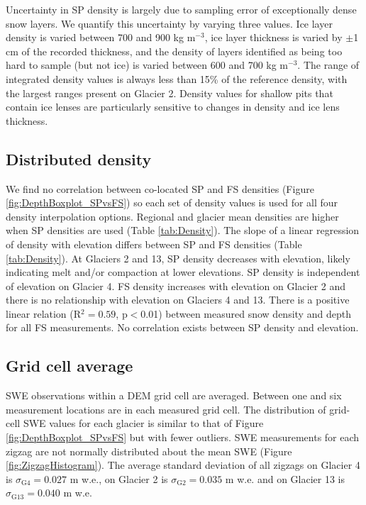 \documentclass[review,oneside, letterpaper]{igs}
\begin{document}
Uncertainty in SP density is largely due to sampling error of exceptionally dense snow layers. We quantify this uncertainty by varying three values. Ice layer density is varied between 700 and 900 kg m$^{-3}$, ice layer thickness is varied by $\pm$1 cm of the recorded thickness, and the density of layers identified as being too hard to sample (but not ice) is varied between 600 and 700 kg m$^{-3}$. The range of integrated density values is always less than 15\% of the reference density, with the largest ranges present on Glacier 2. Density values for shallow pits that contain ice lenses are particularly sensitive to changes in density and ice lens thickness.

\subsection{Distributed density}

We find no correlation between co-located SP and FS densities (Figure \ref{fig:DepthBoxplot_SPvsFS}) so each set of density values is used for all four density interpolation options. Regional and glacier mean densities are higher when SP densities are used (Table \ref{tab:Density}). The slope of a linear regression of density with elevation differs between SP and FS densities (Table \ref{tab:Density}). At Glaciers 2 and 13, SP density decreases with elevation, likely indicating melt and/or compaction at lower elevations. SP density is independent of elevation on Glacier 4. FS density increases with elevation on Glacier 2 and there is no relationship with elevation on Glaciers 4 and 13. There is a positive linear relation (R$^2= 0.59$, p$<$0.01) between measured snow density and depth for all FS measurements. No correlation exists between SP density and elevation.

\subsection{Grid cell average}

SWE observations within a DEM grid cell are averaged. Between one and six measurement locations are in each measured grid cell. The distribution of grid-cell SWE values for each glacier is similar to that of Figure \ref{fig:DepthBoxplot_SPvsFS} but with fewer outliers. SWE measurements for each zigzag are not normally distributed about the mean SWE (Figure \ref{fig:ZigzagHistogram}). The average standard deviation of all zigzags on Glacier 4 is $\sigma_{\mathrm{G4}} =  0.027$ m w.e., on Glacier 2 is $\sigma_{\mathrm{G2}} =  0.035$ m w.e. and on Glacier 13 is $\sigma_{\mathrm{G13}} =  0.040$ m w.e.
\end{document}
